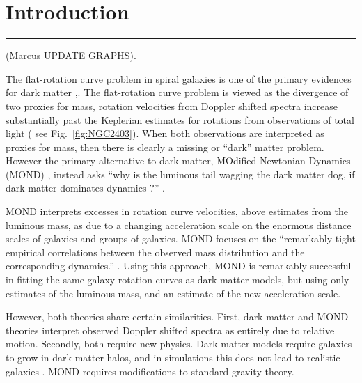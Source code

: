 \documentclass[reprint,%
 amsmath,amssymb,
 aps,
]{revtex4-1}
\begin{document}
\maketitle




\section{Introduction  \label{sec:uno}}
 {\color{teal} \rule{\linewidth}{0.5mm} (Marcus UPDATE GRAPHS).}

 
 The flat-rotation curve  problem in spiral galaxies is one of the primary evidences for dark matter \cite{Rub},\cite{Bosma}.  
 The flat-rotation curve problem is viewed as the divergence of two proxies for mass, rotation velocities from Doppler shifted spectra increase substantially past the Keplerian estimates for rotations from observations of total light  ( see Fig.~\ref{fig:NGC2403}).
When   both observations are interpreted as  proxies for mass,  then there is clearly a    missing or ``dark'' matter problem. However    the primary 
 alternative to dark matter,   MOdified Newtonian Dynamics (MOND) \cite{Milgrom}, instead asks ``why is the luminous tail wagging the dark matter dog,  if dark matter dominates dynamics ?'' \cite{1999McGaugh}.
 
 
  MOND    interprets  excesses in rotation curve velocities,  above estimates from the luminous mass, as due to a changing acceleration scale   on the enormous distance scales of galaxies and groups of galaxies.    MOND    focuses on   the   ``remarkably tight empirical correlations between the observed mass distribution and the corresponding dynamics.'' \cite{McGaugh_2014}. Using this approach, MOND is remarkably successful in fitting the same galaxy rotation curves as dark matter models, but using only estimates of the luminous mass, and an estimate of the new acceleration scale\cite{McGaugh2016RAR}. 
  
  
However, both theories share certain similarities. First,   dark matter and MOND theories interpret observed Doppler shifted spectra  as entirely due to relative motion. Secondly,  both require new physics. Dark matter models require galaxies to grow in    dark matter halos, and in simulations this does not lead to realistic galaxies \cite{de_Blok_2010}.  MOND requires modifications to standard gravity theory. 
\end{document}
